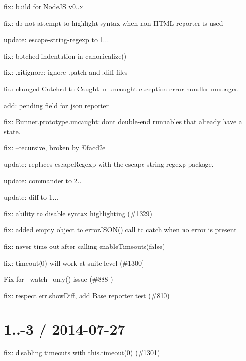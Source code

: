 \begin{DoxyItemize}
\item fix\+: build for Node\+JS v0..\+x
\item fix\+: do not attempt to highlight syntax when non-\/\+H\+T\+ML reporter is used
\item update\+: escape-\/string-\/regexp to 1...
\item fix\+: botched indentation in canonicalize()
\item fix\+: .gitignore\+: ignore .patch and .diff files
\item fix\+: changed \textquotesingle{}Catched\textquotesingle{} to \textquotesingle{}Caught\textquotesingle{} in uncaught exception error handler messages
\item add\+: {\ttfamily pending} field for json reporter
\item fix\+: Runner.\+prototype.\+uncaught\+: don\textquotesingle{}t double-\/end runnables that already have a state.
\item fix\+: --recursive, broken by f0facd2e
\item update\+: replaces escape\+Regexp with the escape-\/string-\/regexp package.
\item update\+: commander to 2...
\item update\+: diff to 1...
\item fix\+: ability to disable syntax highlighting (\#1329)
\item fix\+: added empty object to error\+J\+S\+O\+N() call to catch when no error is present
\item fix\+: never time out after calling enable\+Timeouts(false)
\item fix\+: timeout(0) will work at suite level (\#1300)
\item Fix for --watch+only() issue (\#888 )
\item fix\+: respect err.\+show\+Diff, add Base reporter test (\#810)
\end{DoxyItemize}

\section*{1..-\/3 / 2014-\/07-\/27}


\begin{DoxyItemize}
\item fix\+: disabling timeouts with this.\+timeout(0) (\#1301)
\end{DoxyItemize}

